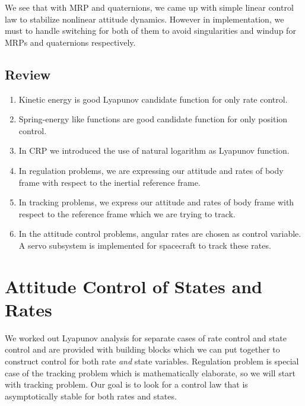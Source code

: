 \documentclass{article}
\begin{document}
We see that with MRP and quaternions, we came up with simple linear control law to stabilize nonlinear attitude dynamics. However in implementation, we must to handle switching for both of them to avoid singularities and windup for MRPs and quaternions respectively.

\subsection{Review}
\begin{enumerate}
  \item Kinetic energy is good Lyapunov candidate function for only rate control.
  \item Spring-energy like functions are good candidate function for only position control.
  \item In CRP we introduced the use of natural logarithm as Lyapunov function.
  \item In regulation problems, we are expressing our attitude and rates of body frame with respect to the inertial reference frame.
  \item In tracking problems, we express our attitude and rates of body frame with respect to the reference frame which we are trying to track.
  \item In the attitude control problems, angular rates are chosen as control variable. A servo subsystem is implemented for spacecraft to track these rates.
\end{enumerate}

\section{Attitude Control of States and Rates}
We worked out Lyapunov analysis for separate cases of rate control and state control and are provided with building blocks which we can put together to construct control for both rate \textit{and} state variables. Regulation problem is special case of the tracking problem which is mathematically elaborate, so we will start with tracking problem. Our goal is to look for a control law that is asymptotically stable for both rates and states.
\end{document}
